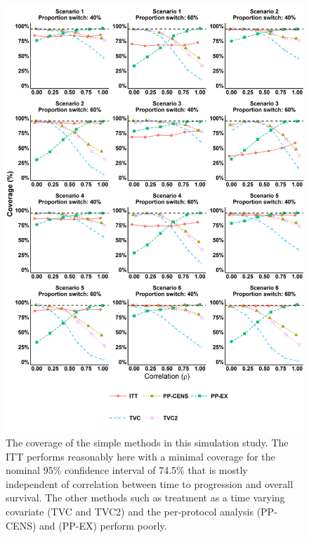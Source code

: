 \begin{figure}[ht]
\centering
\includegraphics[width=13cm]{images/chap_sim3/simple_cov.png}
\caption{\label{F:chap_sim3:simple_cov} The coverage of the simple methods in this simulation study. The ITT performs reasonably here with a minimal coverage for the nominal 95\% confidence interval of 74.5\% that is mostly independent of correlation between time to progression and overall survival. The other methods such as treatment as a time varying covariate (TVC and TVC2) and the per-protocol analysis (PP-CENS) and (PP-EX) perform poorly. } 
\end{figure}

